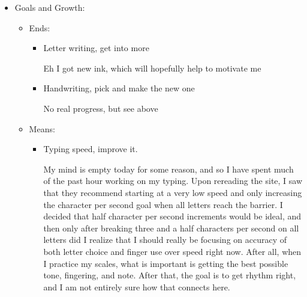 \documentclass[12pt]{article}
\renewcommand{\,}{\textsuperscript{,}}
\begin{document}
\begin{itemize}
\begin{itemize}
\begin{itemize}
I did not have this, which is a bit of a shame.

\item Eat more than 2 meals a day

Made curry last night! And I had it over rice for dinner.  
It was really good, and wow I need to use cumin more.\footnote{if only because I bought a large bottle of it}

\end{itemize}

\end{itemize}

\item Goals and Growth:

\begin{itemize}

\item Ends:

\begin{itemize}

\item Letter writing, get into more

Eh I got new ink, which will hopefully help to motivate me

\item Handwriting, pick and make the new one

No real progress, but see above

\end{itemize}

\item Means:

\begin{itemize}

\item Typing speed, improve it.

My mind is empty today for some reason, and so I have spent much of the past hour working on my typing. Upon rereading the site, I saw that they recommend starting at a very low speed and only increasing the character per second goal when all letters reach the barrier.  
I decided that half character per second increments would be ideal, and then only after breaking three and a half characters per second on all letters did I realize that I should really be focusing on accuracy of both letter choice and finger use over speed right now.  
After all, when I practice my scales, what is important is getting the best possible tone, fingering, and note.  
After that, the goal is to get rhythm right, and I am not entirely sure how that connects here.


\end{itemize}
\end{itemize}
\end{itemize}
\end{document}
